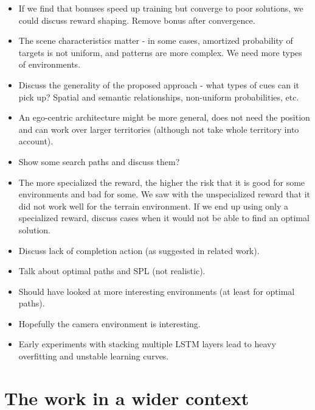 \begin{itemize}
    \item If we find that bonuses speed up training but converge to poor solutions, we could discuss reward shaping. Remove bonus after convergence.
    \item The scene characteristics matter - in some cases, amortized probability of targets is not uniform, and patterns are more complex. We need more types of environments.
    \item Discuss the generality of the proposed approach - what types of cues can it pick up? Spatial and semantic relationships, non-uniform probabilities, etc. 
    \item An ego-centric architecture might be more general, does not need the position and can work over larger territories (although not take whole territory into account).
    \item Show some search paths and discuss them?
    \item The more specialized the reward, the higher the risk that it is good for some environments and bad for some. We saw with the unspecialized reward that it did not work well for the terrain environment. If we end up using only a specialized reward, discuss cases when it would not be able to find an optimal solution.
    \item Discuss lack of completion action (as suggested in related work).
    \item Talk about optimal paths and SPL (not realistic).
    \item Should have looked at more interesting environments (at least for optimal paths).
    \item Hopefully the camera environment is interesting.
    \item Early experiments with stacking multiple LSTM layers lead to heavy overfitting and unstable learning curves.
\end{itemize}

\section{The work in a wider context}
\label{sec:work-wider-context}

% 


